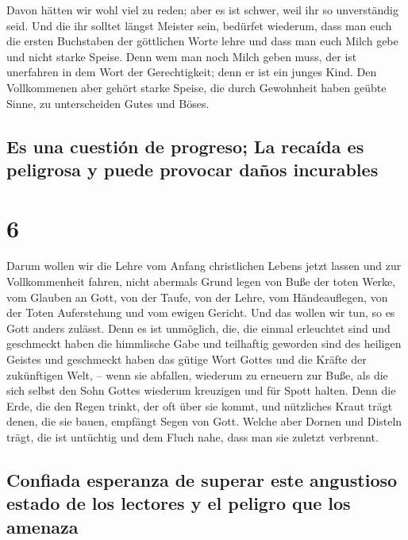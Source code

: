  Davon hätten wir wohl viel zu reden; aber es ist schwer,
weil ihr so unverständig seid.  Und die ihr solltet
längst Meister sein, bedürfet wiederum, dass man euch die ersten
Buchstaben der göttlichen Worte lehre und dass man euch Milch gebe und
nicht starke Speise.  Denn wem man noch Milch geben muss,
der ist unerfahren in dem Wort der Gerechtigkeit; denn er ist ein junges
Kind.  Den Vollkommenen aber gehört starke Speise, die
durch Gewohnheit haben geübte Sinne, zu unterscheiden Gutes und Böses.

\hypertarget{es-una-cuestiuxf3n-de-progreso-la-recauxedda-es-peligrosa-y-puede-provocar-dauxf1os-incurables}{%
\subsection{Es una cuestión de progreso; La recaída es peligrosa y puede
provocar daños
incurables}\label{es-una-cuestiuxf3n-de-progreso-la-recauxedda-es-peligrosa-y-puede-provocar-dauxf1os-incurables}}

\hypertarget{section-5}{%
\section{6}\label{section-5}}

 Darum wollen wir die Lehre vom Anfang christlichen Lebens
jetzt lassen und zur Vollkommenheit fahren, nicht abermals Grund legen
von Buße der toten Werke, vom Glauben an Gott,  von der
Taufe, von der Lehre, vom Händeauflegen, von der Toten Auferstehung und
vom ewigen Gericht.  Und das wollen wir tun, so es Gott
anders zulässt.  Denn es ist unmöglich, die, die einmal
erleuchtet sind und geschmeckt haben die himmlische Gabe und teilhaftig
geworden sind des heiligen Geistes  und geschmeckt haben
das gütige Wort Gottes und die Kräfte der zukünftigen Welt, --
 wenn sie abfallen, wiederum zu erneuern zur Buße, als die
sich selbst den Sohn Gottes wiederum kreuzigen und für Spott halten.
 Denn die Erde, die den Regen trinkt, der oft über sie
kommt, und nützliches Kraut trägt denen, die sie bauen, empfängt Segen
von Gott.  Welche aber Dornen und Disteln trägt, die ist
untüchtig und dem Fluch nahe, dass man sie zuletzt verbrennt.

\hypertarget{confiada-esperanza-de-superar-este-angustioso-estado-de-los-lectores-y-el-peligro-que-los-amenaza}{%
\subsection{Confiada esperanza de superar este angustioso estado de los
lectores y el peligro que los
amenaza}\label{confiada-esperanza-de-superar-este-angustioso-estado-de-los-lectores-y-el-peligro-que-los-amenaza}}

